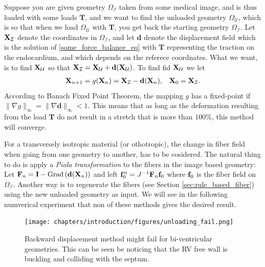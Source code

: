Suppose you are given geometry $\Omega_{\mathcal{I}}$ taken from some medical image, and
is thus loaded with some loads $\mathbf{T}$, and we want to find the unloaded geometry
$\Omega_{\mathcal{U}}$, which is so that when we load $\Omega_{\mathcal{U}}$ with $\mathbf{T}$,
you get back the starting geometry $\Omega_{\mathcal{I}}$. Let
$\mathbf{X}_{\mathcal{I}}$ denote the coordinates in $\Omega_{\mathcal{I}}$, and
let $\mathbf{d}$ denote the displacement field which is the solution
of \eqref{some_force_balance_eq} with $\mathbf{T}$ representing
the traction on the endocardium, and which depends on the referece
coordnates. What we want, is to find
$\mathbf{X}_{\mathcal{U}}$ so that $\mathbf{X}_{\mathcal{I}} =
\mathbf{X}_{\mathcal{U}} + \mathbf{d}(\mathbf{X}_{\mathcal{U}})$. To
find fid $\mathbf{X}_{\mathcal{U}}$ we let
\begin{align}
  \mathbf{X}_{n+1} = g(\mathbf{X}_n) =  \mathbf{X}_{\mathcal{I}} - \mathbf{d}(\mathbf{X}_n),
  && \mathbf{X}_0 = \mathbf{X}_{\mathcal{I}}.
\end{align}
According to Banach Fixed Point Theorem, the mapping $g$ has a
fixed-point if $\| \nabla g \|_{\infty} = \| \nabla \mathbf{d}
\|_{\infty} < 1$. This means that as long as the deformation
resulting from the load $\mathbf{T}$ do not result in a stretch that
is more than $100 \%$, this method will converge.

For a transversely isotropic material (or othotropic), the change in
fiber field when going from one geometry to another, has to be
cosidered. The natural thing to do is apply a \emph{Piola
  transformation} to the fibers in the image based geometry: Let
$\mathbf{F}_{n}= \mathbf{I} - \mathrm{Grad} \left(\mathbf{d}(\mathbf{X}_n) \right)$ and left
$\mathbf{f}_0^{n} = J^{-1}\mathbf{F}_{n} \mathbf{f}_0$ where $\mathbf{f}_0$ is the fiber field on
$\Omega_{\mathcal{I}}$. Another way is to regenerate the fibers (see
Section \ref{sec:rule_based_fiber}) using the new unloaded geometry as
input. We will see in the following numverical experiment that non of
these methods gives the desired result.


\begin{figure}[htbp]
  \centering
    \texttt{[image: chapters/introduction/figures/unloading\_fail.png]}
\caption{Backward displacement method might fail for bi-ventricular
  geometries. This can be seen be noticing that the RV free wall is
  buckling and colliding with the septum.}
\label{fig:unloading_fail}
\end{figure}

